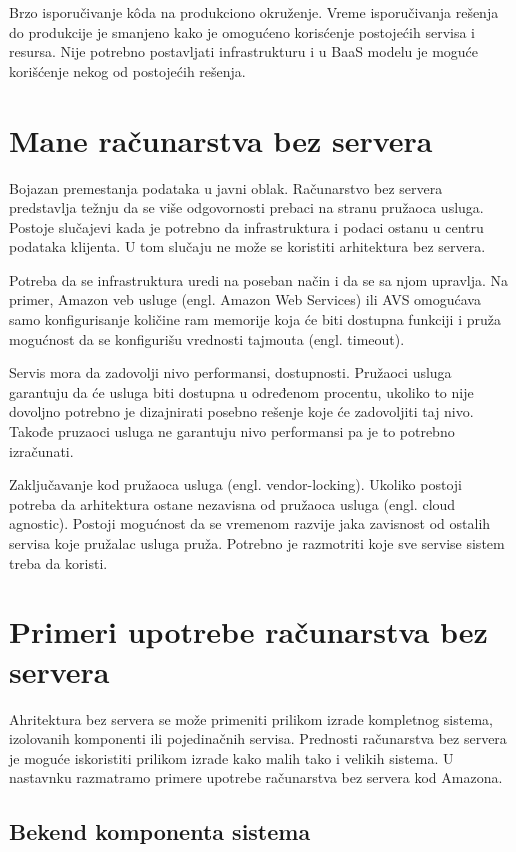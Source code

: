 \documentclass[12pt,oneside]{memoir}
\begin{document}
Brzo isporučivanje kôda na produkciono okruženje. Vreme isporučivanja rešenja do produkcije je smanjeno kako je omogućeno korisćenje postojećih servisa i resursa. Nije potrebno postavljati infrastrukturu i u BaaS modelu je moguće korišćenje nekog od postojećih rešenja.

\section{Mane računarstva bez servera}

Bojazan premestanja podataka u javni oblak. Računarstvo bez servera predstavlja težnju da se više odgovornosti prebaci na stranu pružaoca usluga. Postoje slučajevi kada je potrebno da infrastruktura i podaci ostanu u centru podataka klijenta. U tom slučaju ne može se koristiti arhitektura bez servera\cite{sa}.

Potreba da se infrastruktura uredi na poseban način i da se sa njom upravlja. Na primer, Amazon veb usluge (engl. Amazon Web Services) ili AVS omogućava samo konfigurisanje količine ram memorije koja će biti dostupna funkciji i pruža mogućnost da se konfigurišu vrednosti tajmouta (engl. timeout).

Servis mora da zadovolji nivo performansi, dostupnosti. Pružaoci usluga garantuju da će usluga biti dostupna u određenom procentu, ukoliko to nije dovoljno potrebno je dizajnirati posebno rešenje koje će zadovoljiti taj nivo. Takođe pruzaoci usluga ne garantuju nivo performansi pa je to potrebno izračunati\cite{sa}.

Zaključavanje kod pružaoca usluga (engl. vendor-locking). Ukoliko postoji potreba da arhitektura ostane nezavisna od pružaoca usluga (engl. cloud agnostic). Postoji mogućnost da se vremenom razvije jaka zavisnost od ostalih servisa koje pružalac usluga pruža. Potrebno je razmotriti koje sve servise sistem treba da koristi.
 

\section{Primeri upotrebe računarstva bez servera}

Ahritektura bez servera se može primeniti prilikom izrade kompletnog sistema, izolovanih komponenti ili pojedinačnih servisa. Prednosti računarstva bez servera je moguće iskoristiti prilikom izrade kako malih tako i velikih sistema\cite{sa}. U nastavnku razmatramo primere upotrebe računarstva bez servera kod Amazona.

\subsection{Bekend komponenta sistema}
\end{document}
